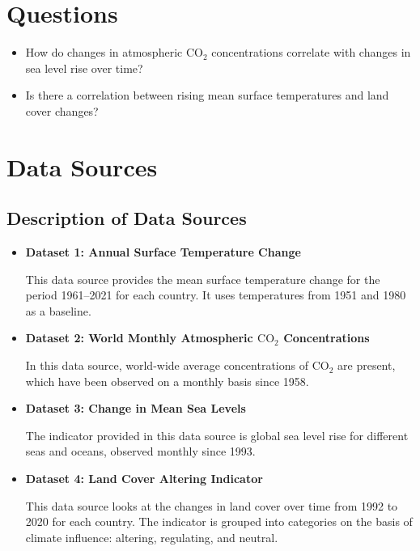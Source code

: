 \documentclass[a4paper,11pt]{article}
\begin{document}
\section{Questions}
\begin{itemize}
    \item How do changes in atmospheric \(\text{CO}_2\) concentrations correlate with changes in sea level rise over time?
    \item Is there a correlation between rising mean surface temperatures and land cover changes?
\end{itemize}

\section{Data Sources}
\subsection{Description of Data Sources}
\begin{itemize}

\item \textbf{Dataset 1: Annual Surface Temperature Change}

This data source provides the mean surface temperature change for the period 1961–2021 for each country. It uses temperatures from 1951 and 1980 as a baseline. \cite{dataset1}

\item \textbf{Dataset 2: World Monthly Atmospheric \(\text{CO}_2\) Concentrations}

In this data source, world-wide average concentrations of \(\text{CO}_2\) are present, which have been observed on a monthly basis since 1958. \cite{dataset2}

\item \textbf{Dataset 3: Change in Mean Sea Levels}

The indicator provided in this data source is global sea level rise for different seas and oceans, observed monthly since 1993. \cite{dataset3}

\item \textbf{Dataset 4: Land Cover Altering Indicator}

This data source looks at the changes in land cover over time from 1992 to 2020 for each country. The indicator is grouped into categories on the basis of climate influence: altering, regulating, and neutral. \cite{dataset4}

\end{itemize}
\end{document}
